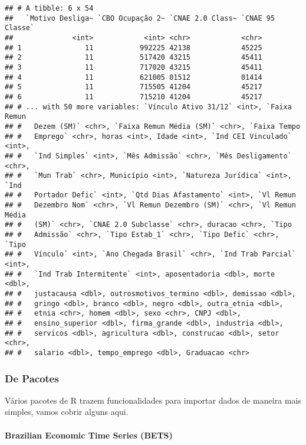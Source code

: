 \documentclass[]{article}
\let\oldparagraph\paragraph
\renewcommand{\paragraph}[1]{\oldparagraph{#1}\mbox{}}
\begin{document}
\begin{verbatim}
## # A tibble: 6 x 54
##   `Motivo Desliga~ `CBO Ocupação 2~ `CNAE 2.0 Class~ `CNAE 95 Classe`
##              <int>            <int> <chr>            <chr>           
## 1               11           992225 42138            45225           
## 2               11           517420 43215            45411           
## 3               11           717020 43215            45411           
## 4               11           621005 01512            01414           
## 5               11           715505 41204            45217           
## 6               11           715210 41204            45217           
## # ... with 50 more variables: `Vínculo Ativo 31/12` <int>, `Faixa Remun
## #   Dezem (SM)` <chr>, `Faixa Remun Média (SM)` <chr>, `Faixa Tempo
## #   Emprego` <chr>, horas <int>, Idade <int>, `Ind CEI Vinculado` <int>,
## #   `Ind Simples` <int>, `Mês Admissão` <chr>, `Mês Desligamento` <chr>,
## #   `Mun Trab` <chr>, Município <int>, `Natureza Jurídica` <int>, `Ind
## #   Portador Defic` <int>, `Qtd Dias Afastamento` <int>, `Vl Remun
## #   Dezembro Nom` <chr>, `Vl Remun Dezembro (SM)` <chr>, `Vl Remun Média
## #   (SM)` <chr>, `CNAE 2.0 Subclasse` <chr>, duracao <chr>, `Tipo
## #   Admissão` <chr>, `Tipo Estab_1` <chr>, `Tipo Defic` <chr>, `Tipo
## #   Vínculo` <int>, `Ano Chegada Brasil` <chr>, `Ind Trab Parcial` <int>,
## #   `Ind Trab Intermitente` <int>, aposentadoria <dbl>, morte <dbl>,
## #   justacausa <dbl>, outrosmotivos_termino <dbl>, demissao <dbl>,
## #   gringo <dbl>, branco <dbl>, negro <dbl>, outra_etnia <dbl>,
## #   etnia <chr>, homem <dbl>, sexo <chr>, CNPJ <dbl>,
## #   ensino_superior <dbl>, firma_grande <dbl>, industria <dbl>,
## #   servicos <dbl>, agricultura <dbl>, construcao <dbl>, setor <chr>,
## #   salario <dbl>, tempo_emprego <dbl>, Graduacao <chr>
\end{verbatim}

\subsubsection{De Pacotes}\label{de-pacotes}

Vários pacotes de R trazem funcionalidades para importar dados de
maneira mais simples, vamos cobrir alguns aqui.

\paragraph{Brazilian Economic Time Series
(BETS)}\label{brazilian-economic-time-series-bets}
\end{document}
